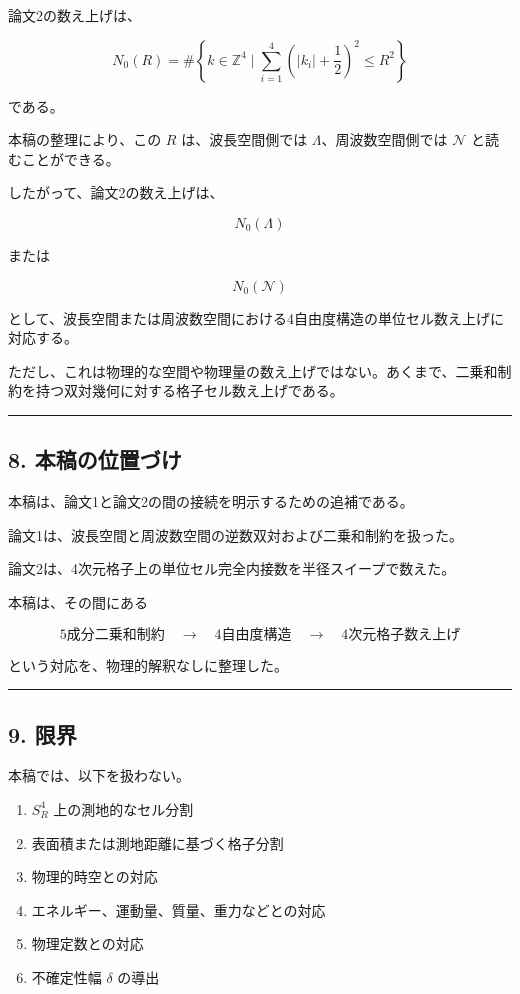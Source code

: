 \documentclass[
]{ltjsarticle}
\providecommand{\tightlist}{%
  \setlength{\itemsep}{0pt}\setlength{\parskip}{0pt}}
\begin{document}
論文2の数え上げは、

\[
N_0(R)
=
\#\left\{
k\in\mathbb{Z}^4
\mid
\sum_{i=1}^{4}
\left(|k_i|+\frac12\right)^2
\le R^2
\right\}
\]

である。

本稿の整理により、この \(R\) は、波長空間側では
\(\Lambda\)、周波数空間側では \(\mathcal{N}\) と読むことができる。

したがって、論文2の数え上げは、

\[
N_0(\Lambda)
\]

または

\[
N_0(\mathcal{N})
\]

として、波長空間または周波数空間における4自由度構造の単位セル数え上げに対応する。

ただし、これは物理的な空間や物理量の数え上げではない。あくまで、二乗和制約を持つ双対幾何に対する格子セル数え上げである。

\begin{center}\rule{0.5\linewidth}{0.5pt}\end{center}

\subsection{8.
本稿の位置づけ}\label{ux672cux7a3fux306eux4f4dux7f6eux3065ux3051}

本稿は、論文1と論文2の間の接続を明示するための追補である。

論文1は、波長空間と周波数空間の逆数双対および二乗和制約を扱った。

論文2は、4次元格子上の単位セル完全内接数を半径スイープで数えた。

本稿は、その間にある

\[
5成分二乗和制約
\quad\longrightarrow\quad
4自由度構造
\quad\longrightarrow\quad
4次元格子数え上げ
\]

という対応を、物理的解釈なしに整理した。

\begin{center}\rule{0.5\linewidth}{0.5pt}\end{center}

\subsection{9. 限界}\label{ux9650ux754c}

本稿では、以下を扱わない。

\begin{enumerate}
\def\labelenumi{\arabic{enumi}.}
\tightlist
\item
  \(S^4_R\) 上の測地的なセル分割\\
\item
  表面積または測地距離に基づく格子分割\\
\item
  物理的時空との対応\\
\item
  エネルギー、運動量、質量、重力などとの対応\\
\item
  物理定数との対応\\
\item
  不確定性幅 \(\delta\) の導出
\end{enumerate}
\end{document}
